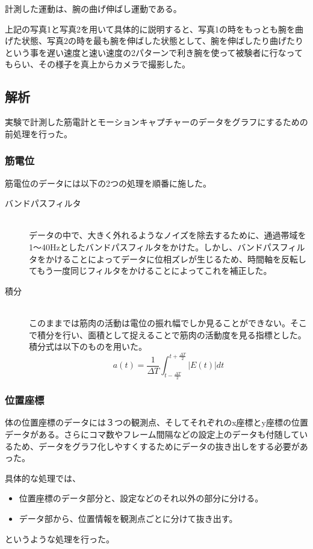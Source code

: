 \documentclass{jsarticle}
\begin{document}
計測した運動は、腕の曲げ伸ばし運動である。

上記の写真1と写真2を用いて具体的に説明すると、写真1の時をもっとも腕を曲げた状態、写真2の時を最も腕を伸ばした状態として、腕を伸ばしたり曲げたりという事を遅い速度と速い速度の2パターンで利き腕を使って被験者に行なってもらい、その様子を真上からカメラで撮影した。

\subsection{解析}
実験で計測した筋電計とモーションキャプチャーのデータをグラフにするための前処理を行った。

\subsubsection{筋電位}
筋電位のデータには以下の2つの処理を順番に施した。
\begin{description}
 \item[バンドパスフィルタ]\mbox{}\\
   データの中で、大きく外れるようなノイズを除去するために、通過帯域を1〜40Hzとしたバンドパスフィルタをかけた。しかし、バンドパスフィルタをかけることによってデータに位相ズレが生じるため、時間軸を反転してもう一度同じフィルタをかけることによってこれを補正した。
 \item[積分]\mbox{}\\
   このままでは筋肉の活動は電位の振れ幅でしか見ることができない。そこで積分を行い、面積として捉えることで筋肉の活動度を見る指標とした。積分式は以下のものを用いた。
   \begin{equation}
     a(t) = \frac{1}{\Delta T} \int_{t-\frac{\Delta T}{2}}^{t+\frac{\Delta T}{2}} |E(t)| dt
   \end{equation}
\end{description}

\subsubsection{位置座標}
体の位置座標のデータには３つの観測点、そしてそれぞれのx座標とy座標の位置データがある。さらにコマ数やフレーム間隔などの設定上のデータも付随しているため、データをグラフ化しやすくするためにデータの抜き出しをする必要があった。

具体的な処理では、
\begin{itemize}
 \item 位置座標のデータ部分と、設定などのそれ以外の部分に分ける。
 \item データ部から、位置情報を観測点ごとに分けて抜き出す。
\end{itemize}
というような処理を行った。
\newpage
\end{document}
